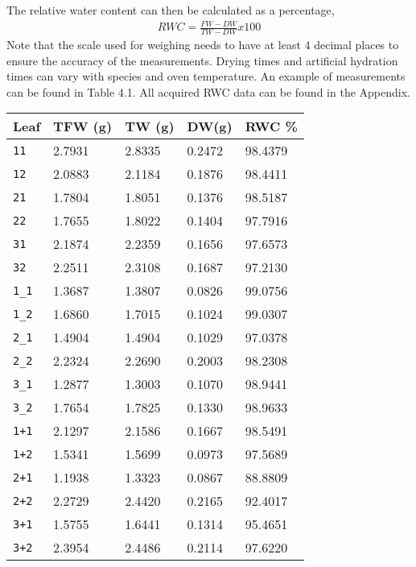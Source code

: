 The relative water content can then be calculated as a percentage,
%
\begin{align}
    RWC = \frac{FW - DW}{TW - DW} x 100%
\end{align}
%
Note that the scale used for weighing needs to have at least 4 decimal places to ensure the accuracy of the measurements. Drying times and artificial hydration times can vary with species and oven temperature. An example of measurements can be found in Table 4.1.  All acquired RWC data can be found in the Appendix.
%
\begin{table}[htb]
  \centering
  \begin{tabular}{lllll}
    \toprule
    \textbf{Leaf} & \textbf{TFW (g)} & \textbf{TW (g)} & \textbf{DW(g)} & \textbf{RWC \%} \\
    \midrule
      \texttt{11} & 2.7931 & 2.8335 & 0.2472 & 98.4379 \\
      \texttt{12} & 2.0883 & 2.1184 & 0.1876 & 98.4411 \\
      \texttt{21} & 1.7804 & 1.8051 & 0.1376 & 98.5187 \\
      \texttt{22} & 1.7655 & 1.8022 & 0.1404 & 97.7916 \\
      \texttt{31} & 2.1874 & 2.2359 & 0.1656 & 97.6573 \\
      \texttt{32} & 2.2511 & 2.3108 & 0.1687 & 97.2130 \\
      \texttt{1\_1} & 1.3687 & 1.3807 & 0.0826 & 99.0756 \\
      \texttt{1\_2} & 1.6860 & 1.7015 & 0.1024 & 99.0307 \\
      \texttt{2\_1} & 1.4904 & 1.4904 & 0.1029 & 97.0378 \\
      \texttt{2\_2} & 2.2324 & 2.2690 & 0.2003 & 98.2308 \\
      \texttt{3\_1} & 1.2877 & 1.3003 & 0.1070 & 98.9441 \\
      \texttt{3\_2} & 1.7654 & 1.7825 & 0.1330 & 98.9633 \\
      \texttt{1+1} & 2.1297 & 2.1586 & 0.1667 & 98.5491 \\
      \texttt{1+2} & 1.5341 & 1.5699 & 0.0973 & 97.5689 \\
      \texttt{2+1} & 1.1938 & 1.3323 & 0.0867 & 88.8809 \\
      \texttt{2+2} & 2.2729 & 2.4420 & 0.2165 & 92.4017 \\
      \texttt{3+1} & 1.5755 & 1.6441 & 0.1314 & 95.4651 \\
      \texttt{3+2} & 2.3954 & 2.4486 & 0.2114 & 97.6220 \\

\end{tabular}
\end{table}
